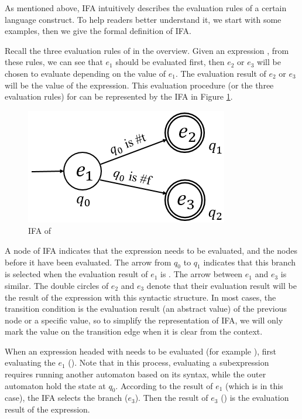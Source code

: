 
As mentioned above, IFA intuitively describes the evaluation rules of a certain language construct. To help readers better understand it, we start with some examples, then we give the formal definition of IFA.

\begin{example}[IFA of~~ \m{if}]

    Recall the three evaluation rules of  in the overview. Given an expression , from these rules, we can see that $e_1$ should be evaluated first, then $e_2$ or $e_3$ will be chosen to evaluate depending on the value of $e_1$. The evaluation result of $e_2$ or $e_3$ will be the value of the expression. This evaluation procedure (or the three evaluation rules) for  can be represented by the IFA in Figure \ref{fig:ifa-if}.

    \begin{figure}[t]
        \centering
        \includegraphics[scale=0.25]{images/ifa/ifa-if.png}
        \caption{IFA of }
        \label{fig:ifa-if}
    \end{figure}

    A node of IFA indicates that the expression needs to be evaluated, and the nodes before it have been evaluated. The arrow from $q_0$ to $q_1$ indicates that this branch is selected when the evaluation result of $e_1$ is . The arrow between $e_1$ and $e_3$ is similar. The double circles of $e_2$ and $e_3$ denote that their evaluation result will be the result of the expression with this syntactic structure. In most cases, the transition condition is the evaluation result (an abstract value) of the previous node or a specific value, so to simplify the representation of IFA, we will only mark the value on the transition edge when it is clear from the context.

    When an expression headed with  needs to be evaluated (for example ), first evaluating the $e_1$ (). Note that in this process, evaluating a subexpression requires running another automaton based on its syntax, while the outer automaton hold the state at $q_0$. According to the result of $e_1$ (which is  in this case), the IFA selects the branch ($e_3$). Then the result of $e_3$ () is the evaluation result of the expression.
    \myend
\end{example}

